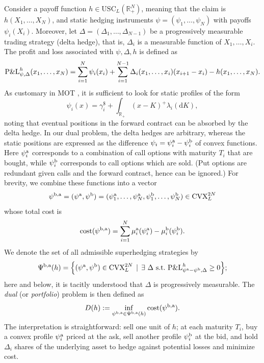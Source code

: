 \documentclass[11pt]{article}
\newcommand{\R}{\mathbb{R}} %
\theoremstyle{plain}
\theoremstyle{definition}
\theoremstyle{remark}
\newcommand*{\rd}{\mathrm{d}}
\theoremstyle{plain}
\begin{document}
 Consider a payoff function $h\in \text{USC}_L(\R_+^N)$, meaning that the claim is $h(X_1,\ldots, X_N)$, and static hedging instruments $\psi = (\psi_1,\ldots, \psi_N)$ with payoffs $\psi_i(X_i)$. Moreover, let $\Delta = (\Delta_1,\ldots, \Delta_{N-1})$ be a progressively measurable trading strategy (delta hedge), that is, $\Delta_i$ is a measurable function of $X_1,\ldots, X_i$. The profit and loss associated with $\psi,\Delta, h$ is defined as 
\begin{equation*}\label{eq:PnL}
    \textnormal{P\&L}_{\psi,\Delta}^h(x_1,\ldots,x_N) = \sum_{i=1}^N\psi_i(x_i) + \sum_{i=1}^{N-1} \Delta_i(x_1,\ldots, x_i)(x_{i+1}-x_i) - h(x_1,\ldots,x_N).
\end{equation*}
As customary in MOT \cite{beiglbock2013model,HLBook}, %
it is sufficient to look for static profiles of the form 
$$\psi_i(x) = \gamma^{\$}_i + \int_{\R_+}(x-K)^{+}\lambda_i(\rd K),$$
noting that eventual positions in the forward contract can be absorbed by the delta hedge. 
In our dual problem, the delta hedges are arbitrary, whereas the static positions are expressed as the difference $\psi_i = \psi^{\rm{a}}_i - \psi^{\rm{b}}_i$ of convex functions. Here $\psi^{\rm{a}}_i$ corresponds to a combination of call options with maturity $T_i$ that are bought, while $\psi^{\rm{b}}_i$ corresponds to call options which are sold. (Put options are redundant given calls and the forward contract, hence can be ignored.)
%
For brevity, we combine these functions into a vector 
$$\psi^{\rm b,a}=(\psi^{\rm a},\psi^{\rm b})=(\psi^{\rm a}_1, \dots, \psi^{\rm a}_N, \psi^{\rm b}_1, \dots, \psi^{\rm b}_N)\in \text{CVX}_L^{2N}$$
whose total cost is 
\begin{equation*}
\text{cost}(\psi^{\rm b,a}) =  \sum_{i=1}^N  \mu^{\rm a}_i(\psi^{\rm a}_i) - \mu^{\rm{b}}_i(\psi^{\rm b}_i).
\end{equation*}
We denote the set of all admissible superhedging strategies by
 \begin{equation}\label{eq:admissibleDual}
     \Psi^{\rm b,a}(h) = \Big\{  (\psi^{\rm a},\psi^{\rm b})\in \text{CVX}_L^{2N} \, \mid \, \exists \ {\Delta} \text{ s.t.\  }   \textnormal{P\&L}_{\psi^{\rm a} - \psi^{\rm b},\Delta}^h\ge 0  \Big\};
 \end{equation} 
here and below, it is tacitly understood that $\Delta$ is progressively measurable. The \emph{dual} (or \emph{portfolio}) problem is then defined as
\begin{equation}\label{eq:BAMOT-dual}
D(h):=\inf_{\psi^{\rm b,a} \in \Psi^{\rm b,a}(h)} \text{cost}(\psi^{\rm b,a}). %
\end{equation} 
The interpretation is straightforward: sell one unit of $h$; at each maturity $T_i$, buy a convex profile $\psi_i^{\rm a}$ priced at the ask, sell another profile $\psi_i^{\rm b}$ at the bid,  %
and hold  $\Delta_i$ shares  of the underlying asset to hedge against potential losses and minimize cost.
\end{document}
